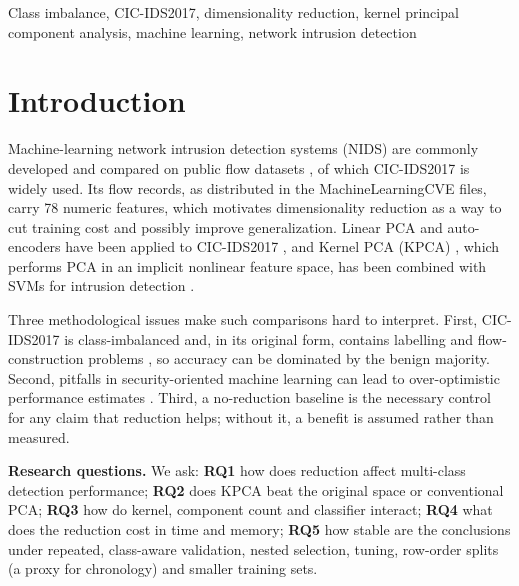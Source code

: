 \documentclass{ieeeaccess}
\begin{document}
\begin{keywords}
Class imbalance, CIC-IDS2017, dimensionality reduction, kernel principal component analysis, machine learning, network intrusion detection
\end{keywords}

\titlepgskip=-21pt
\maketitle

\section{Introduction}
Machine-learning network intrusion detection systems (NIDS) are commonly developed and compared on public flow datasets \cite{ring2019}, of which CIC-IDS2017 \cite{sharafaldin2018} is widely used. Its flow records, as distributed in the MachineLearningCVE files, carry 78 numeric features, which motivates dimensionality reduction as a way to cut training cost and possibly improve generalization. Linear PCA and auto-encoders have been applied to CIC-IDS2017 \cite{abdulhammed2019}, and Kernel PCA (KPCA) \cite{scholkopf1998}, which performs PCA in an implicit nonlinear feature space, has been combined with SVMs for intrusion detection \cite{kuang2014}.

Three methodological issues make such comparisons hard to interpret. First, CIC-IDS2017 is class-imbalanced and, in its original form, contains labelling and flow-construction problems \cite{engelen2021,panigrahi2018}, so accuracy can be dominated by the benign majority. Second, pitfalls in security-oriented machine learning can lead to over-optimistic performance estimates \cite{arp2022}. Third, a no-reduction baseline is the necessary control for any claim that reduction helps; without it, a benefit is assumed rather than measured.

\textbf{Research questions.} We ask: \textbf{RQ1} how does reduction affect multi-class detection performance; \textbf{RQ2} does KPCA beat the original space or conventional PCA; \textbf{RQ3} how do kernel, component count and classifier interact; \textbf{RQ4} what does the reduction cost in time and memory; \textbf{RQ5} how stable are the conclusions under repeated, class-aware validation, nested selection, tuning, row-order splits (a proxy for chronology) and smaller training sets.
\end{document}
